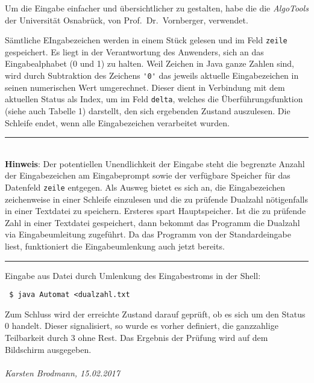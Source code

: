 \documentclass[draft=false]{scrartcl}
\newenvironment{achtung}[1][Achtung]{%
	\rule{\textwidth}{1pt}\\%
	\textbf{#1}: %
}{%
	\\\rule[1ex]{\textwidth}{1pt}%
}
\begin{document}
Um die Eingabe einfacher und übersichtlicher zu gestalten, habe die die \emph{AlgoTools} der Universität Osnabrück, von Prof.\ Dr.\ Vornberger, verwendet. 

Sämtliche EIngabezeichen werden in einem Stück gelesen und im Feld \verb|zeile| gespeichert. Es liegt in der Verantwortung des Anwenders, sich an das Eingabealphabet (0 und 1) zu halten. Weil Zeichen in Java ganze Zahlen sind, wird durch Subtraktion des Zeichens \verb|'0'| das jeweils aktuelle Eingabezeichen in seinen numerischen Wert umgerechnet. Dieser dient in Verbindung mit dem aktuellen Status als Index, um im Feld \verb|delta|, welches die Überführungsfunktion (siehe auch Tabelle 1) darstellt, den sich ergebenden Zustand auszulesen. Die Schleife endet, wenn alle Eingabezeichen verarbeitet wurden.

\begin{achtung}[Hinweis] %
Der potentiellen Unendlichkeit der Eingabe steht die begrenzte Anzahl der Eingabezeichen am Eingabeprompt sowie der verfügbare Speicher für das Datenfeld \verb|zeile| entgegen. Als Ausweg bietet es sich an, die Eingabezeichen zeichenweise in einer Schleife einzulesen und die zu prüfende Dualzahl nötigenfalls in einer Textdatei zu speichern. Ersteres spart Hauptspeicher. Ist die zu prüfende Zahl in einer Textdatei gespeichert, dann bekommt das Programm die Dualzahl via Eingabeumleitung zugeführt. Da das Programm von der Standardeingabe liest, funktioniert die Eingabeumlenkung auch jetzt bereits.
\end{achtung}

 Eingabe aus Datei durch Umlenkung des Eingabestroms in der Shell:

\verb| $ java Automat <dualzahl.txt|

Zum Schluss wird der erreichte Zustand darauf geprüft, ob es sich um den Status 0 handelt. Dieser signalisiert, so wurde es vorher definiert, die ganzzahlige Teilbarkeit durch 3 ohne Rest. Das Ergebnis der Prüfung wird auf dem Bildschirm ausgegeben.
\\\\
\textsl{Karsten Brodmann, 15.02.2017} 
\end{document}
